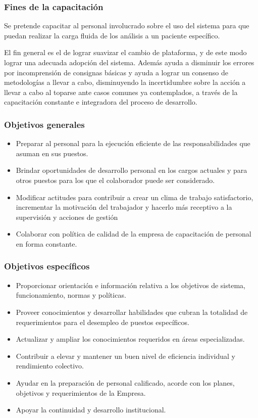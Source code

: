 \documentclass[a4paper,12pt]{article}
\begin{document}
\subsubsection{Fines de la capacitación}
Se pretende capacitar al personal involucrado sobre el uso del sistema para que puedan realizar la carga fluida de los análisis a un  paciente específico.

El fin general es el de  lograr suavizar el cambio de plataforma, y de este modo lograr una adecuada adopción del sistema. Además ayuda a disminuir los errores por incomprensión de consignas básicas y ayuda a lograr un consenso de metodologías a llevar a cabo, disminuyendo la incertidumbre  sobre la acción a llevar a cabo al toparse ante casos comunes ya contemplados, a través de la capacitación constante e integradora del  proceso de desarrollo.

\subsubsection{Objetivos generales}
    \begin{itemize}
	    \item Preparar al personal para la ejecución eficiente de las responsabilidades que
asuman en sus puestos.
	    \item Brindar oportunidades de desarrollo personal en los cargos actuales y para
otros puestos para los que el colaborador puede ser considerado.
	    \item Modificar actitudes para contribuir a crear un clima de trabajo satisfactorio,
incrementar la motivación del trabajador y hacerlo más receptivo a la
supervisión y acciones de gestión
	    \item Colaborar con política de calidad de la empresa de capacitación de personal
en forma constante.
    \end{itemize}
    
\subsubsection{Objetivos específicos}
    \begin{itemize}
	    \item Proporcionar orientación e información relativa a los objetivos de sistema, funcionamiento, normas y políticas.
	    \item Proveer conocimientos y desarrollar habilidades que cubran la totalidad de
   requerimientos para el desempleo de puestos específicos.
	    \item  Actualizar y ampliar los conocimientos requeridos en áreas especializadas.
	    \item Contribuir a elevar y mantener un buen nivel de eficiencia individual y
rendimiento colectivo.
	    \item  Ayudar en la preparación de personal calificado, acorde con los planes,
    objetivos y requerimientos de la Empresa.
	    \item  Apoyar la continuidad y desarrollo institucional.
    \end{itemize}
\end{document}
